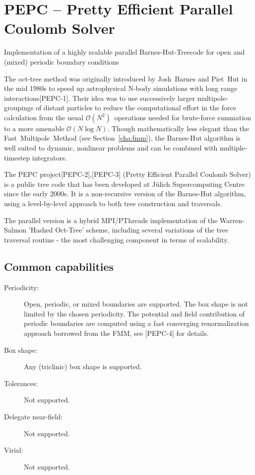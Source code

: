 \chapter{PEPC -- Pretty Efficient Parallel Coulomb Solver}
\label{cha:pepc}

\newcommand{\pepccite}[1]{\mbox{[PEPC-#1]}}
\newcommand{\algO}[1]{\ensuremath{\mathcal{O}(#1)}}


Implementation of a highly scalable parallel Barnes-Hut-Treecode for
open and (mixed) periodic boundary conditions

The oct-tree method was originally introduced by Josh~Barnes and Piet~Hut 
in the mid 1980s to speed up astrophysical N-body simulations with long 
range interactions\pepccite{1}. Their idea was to use successively 
larger multipole-groupings of distant particles to reduce the 
computational effort in the force calculation from the usual
\algO{N^2}~operations needed for brute-force summation to a more amenable 
\algO{N\log N}. Though mathematically less elegant than the 
Fast~Multipole~Method (see Section~\ref{cha:fmm}), the Barnes-Hut 
algorithm is well suited to dynamic, nonlinear problems and can be 
combined with multiple-timestep integrators.

The PEPC project\pepccite{2},\pepccite{3} (Pretty Efficient Parallel Coulomb Solver) is 
a public tree code that has been developed at J\"ulich Supercomputing Centre 
since the early 2000s. It is a non-recursive version of the Barnes-Hut 
algorithm, using a level-by-level approach to both tree construction 
and traversals. 

The parallel version is a hybrid MPI/PThreads implementation of the 
Warren-Salmon 'Hashed Oct-Tree' scheme, including several variations 
of the tree traversal routine - the most challenging component in terms of scalability.

\section*{Common capabilities}
     
\begin{description}
  
\item[Periodicity:]
  Open, periodic, or mixed boundaries are supported. The box shape is not limited 
  by the chosen periodicity. The potential and field contribution of periodic boundaries are
  computed using a fast converging renormalization approach borrowed from the FMM,
  see \pepccite{4} for details.

\item[Box shape:] Any (triclinic) box shape is supported.
  
\item[Tolerances:] Not supported.
  
\item[Delegate near-field:] Not supported.
  
\item[Virial:] Not supported.
  
\end{description}

